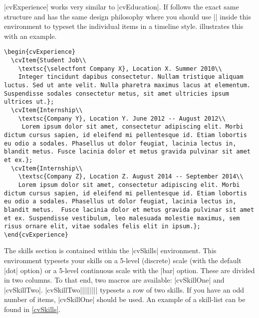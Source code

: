\documentclass{ltxdoc}
\begin{document}
  |cvExperience| works very similar to |cvEducation|. If follows the exact same structure and has the same design philosophy where you should use |\cvItem| inside this environment to typeset the individual items in a timeline style. \Cref{} illustrates this with an example.

  \begin{lstlisting}[caption={\lstinline!cvExperience! code example.}]
\begin{cvExperience}
  \cvItem{Student Job\\
    \textsc{\selectfont Company X}, Location X. Summer 2010\\
    Integer tincidunt dapibus consectetur. Nullam tristique aliquam luctus. Sed ut ante velit. Nulla pharetra maximus lacus at elementum. Suspendisse sodales consectetur metus, sit amet ultricies ipsum ultrices ut.};
  \cvItem{Internship\\
    \textsc{Company Y}, Location Y. June 2012 -- August 2012\\
     Lorem ipsum dolor sit amet, consectetur adipiscing elit. Morbi dictum cursus sapien, id eleifend mi pellentesque id. Etiam lobortis eu odio a sodales. Phasellus ut dolor feugiat, lacinia lectus in, blandit metus. Fusce lacinia dolor et metus gravida pulvinar sit amet et ex.};
  \cvItem{Internship\\
    \textsc{Company Z}, Location Z. August 2014 -- September 2014\\
    Lorem ipsum dolor sit amet, consectetur adipiscing elit. Morbi dictum cursus sapien, id eleifend mi pellentesque id. Etiam lobortis eu odio a sodales. Phasellus ut dolor feugiat, lacinia lectus in, blandit metus.  Fusce lacinia dolor et metus gravida pulvinar sit amet et ex. Suspendisse vestibulum, leo malesuada molestie maximus, sem risus ornare elit, vitae sodales felis elit in ipsum.};
\end{cvExperience}
  \end{lstlisting}
  
  The skills section is contained within the |cvSkills| environment. This environment typesets your skills on a 5-level (discrete) scale (with the default |dot| option) or a 5-level continuous scale with the |bar| option. These are divided in two columns. To that end, two macros are available: |cvSkillOne| and |cvSkillTwo|.  |cvSkillTwo{||}{||}{||}{||}| typesets a row of two skills. If you have an odd number of items,  |cvSkillOne| should be used. An example of a skill-list can be found in \cref{cvSkills}.
  
\end{document}

